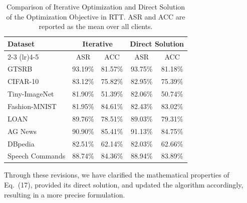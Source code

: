\documentclass[11pt,a4paper]{article}
\newcommand{\manualindent}{\par\noindent\hspace*{1.5em}\ignorespaces}
\begin{document}
{\begin{table}[H]
\centering
\caption{Comparison of Iterative Optimization and Direct Solution of the Optimization Objective in RTT. ASR and ACC are reported as the mean over all clients.}
\label{tab:optimization_comparison}
\renewcommand\arraystretch{1.0}
\setlength{\tabcolsep}{12pt}
\begin{tabular}{lcccc}
\toprule
\multirow{2}{*}{Dataset}
& \multicolumn{2}{c}{Iterative}
& \multicolumn{2}{c}{Direct Solution} \\
\cmidrule(lr){2-3}
\cmidrule(lr){4-5}
& ASR & ACC & ASR & ACC \\
\midrule
GTSRB           & 93.19\% & 81.57\% & 93.75\% & 81.18\% \\
CIFAR-10        & 83.12\% & 75.82\% & 82.95\% & 75.39\% \\
Tiny-ImageNet   & 81.90\% & 51.39\% & 82.06\% & 50.74\% \\
Fashion-MNIST   & 81.95\% & 84.61\% & 82.43\% & 83.02\% \\
LOAN            & 89.76\% & 78.51\% & 89.03\% & 79.31\% \\
AG News         & 90.90\% & 85.41\% & 91.13\% & 84.75\% \\
DBpedia         & 82.51\% & 62.14\% & 82.03\% & 62.66\% \\
Speech Commands & 88.74\% & 84.36\% & 88.94\% & 83.89\% \\
\bottomrule
\end{tabular}
\end{table}

\manualindent Through these revisions, we have clarified the mathematical properties of Eq.~(17), provided its direct solution, and updated the algorithm accordingly, resulting in a more precise formulation.
}
\end{document}
